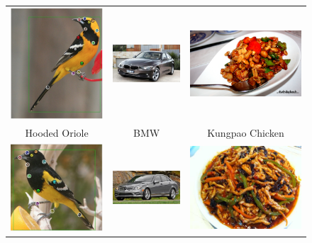 \documentclass[10pt,twocolumn,letterpaper]{article}
\begin{document}
\setlength{\tabcolsep}{0.5pt}
\begin{figure}[t]
\begin{center}
\begin{tabular}{ccc}
\includegraphics[height=0.25\linewidth,width=0.25\linewidth]{figs/hooded_oriole} &
\includegraphics[height=0.25\linewidth,width=0.4\linewidth]{figs/bmw} &
\includegraphics[height=0.25\linewidth,width=0.3\linewidth]{figs/kungpao_chicken} \\
\vspace{2pt}
Hooded Oriole & BMW & Kungpao Chicken \\
\includegraphics[height=0.25\linewidth,width=0.25\linewidth]{figs/scott_oriole} &
\includegraphics[height=0.25\linewidth,width=0.4\linewidth]{figs/benz} &
\includegraphics[height=0.25\linewidth,width=0.3\linewidth]{figs/yuxiang_rousi} \\

\end{tabular}
\end{center}
\end{figure}
\end{document}
